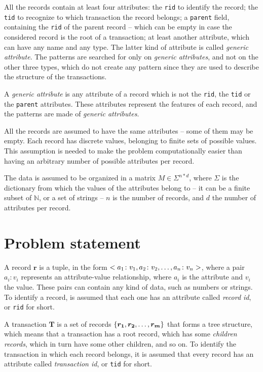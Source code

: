 \documentclass{acm_proc_article-sp-sigmod09}
\begin{document}
All the records contain at least four attributes: the \texttt{rid} to identify the record; the \texttt{tid} to recognize to which transaction the record belongs; a \texttt{parent} field, containing the \texttt{rid} of the parent record -- which can be empty in case the considered record is the root of a transaction; at least another attribute, which can have any name and any type. The latter kind of attribute is called \emph{generic attribute}. The patterns are searched for only on \emph{generic attributes}, and not on the other three types, which do not create any pattern since they are used to describe the structure of the transactions.

\begin{definition}
A \emph{generic attribute} is any attribute of a record which is not the \texttt{rid}, the \texttt{tid} or the \texttt{parent} attributes. These attributes represent the features of each record, and the patterns are made of \emph{generic attributes}.
\end{definition}

All the records are assumed to have the same attributes -- some of them may be empty. Each record has discrete values, belonging to finite sets of possible values. This assumption is needed to make the problem computationally easier than having an arbitrary number of possible attributes per record.

The data is assumed to be organized in a matrix $M \in \Sigma^{n * d}$, where $\Sigma$ is the dictionary from which the values of the attributes belong to -- it can be a finite subset of $\mathbb{N}$, or a set of strings -- $n$ is the number of records, and $d$ the number of attributes per record.

\section{Problem statement}
A record $\boldsymbol{r}$ is a tuple, in the form $<a_1 \colon v_1, a_2 \colon v_2, \text{\dots}, a_n \colon v_n>$, where a pair $a_i \colon v_i$ represents an attribute-value relationship, where $a_i$ is the attribute and $v_i$ the value. These pairs can contain any kind of data, such as numbers or strings. To identify a record, is assumed that each one has an attribute called \emph{record id}, or \texttt{rid} for short.

A transaction $\boldsymbol{T}$ is a set of records $\{\boldsymbol{r_1}, \boldsymbol{r_2}, \text{\dots}, \boldsymbol{r_m}\}$ that forms a tree structure, which means that a transaction has a root record, which has some \emph{children records}, which in turn have some other children, and so on. To identify the transaction in which each record belongs, it is assumed that every record has an attribute called \emph{transaction id}, or \texttt{tid} for short.
\end{document}
